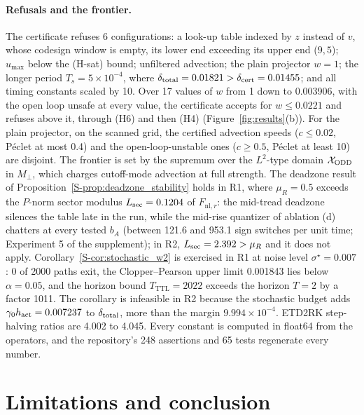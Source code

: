 \paragraph{Refusals and the frontier.}
The certificate refuses 6 configurations: a look-up table indexed by $z$ instead of $v$, whose codesign window is empty, its lower end exceeding its upper end ($9,5$); $u_{\max}$ below the (H-sat) bound; unfiltered advection; the plain projector $w = 1$; the longer period $T_s = 5\times10^{-4}$, where $\delta_{\mathrm{total}} = 0.01821 > \delta_{\mathrm{cert}} = 0.01455$; and all timing constants scaled by 10. Over 17 values of $w$ from 1 down to 0.003906, with the open loop unsafe at every value, the certificate accepts for $w \le 0.0221$ and refuses above it, through (H6) and then (H4) (Figure~\ref{fig:results}(b)). For the plain projector, on the scanned grid, the certified advection speeds ($c \le 0.02$, P\'eclet at most 0.4) and the open-loop-unstable ones ($c \ge 0.5$, P\'eclet at least 10) are disjoint. The frontier is set by the supremum over the $L^2$-type domain $\mathcal{X}_{\mathrm{ODD}}$ in $M_\perp$, which charges cutoff-mode advection at full strength. The deadzone result of Proposition~\ref{S-prop:deadzone_stability} holds in R1, where $\mu_R = 0.5$ exceeds the $P$-norm sector modulus $L_{\mathrm{sec}} = 0.1204$ of $F_{\mathrm{nl},r}$: the mid-tread deadzone silences the table late in the run, while the mid-rise quantizer of ablation (d) chatters at every tested $b_A$ (between 121.6 and 953.1 sign switches per unit time; Experiment 5 of the supplement); in R2, $L_{\mathrm{sec}} = 2.392 > \mu_R$ and it does not apply. Corollary~\ref{S-cor:stochastic_w2} is exercised in R1 at noise level $\sigma^\star = 0.007$: 0 of 2000 paths exit, the Clopper--Pearson upper limit 0.001843 lies below $\alpha = 0.05$, and the horizon bound $T_{\mathrm{TTL}} = 2022$ exceeds the horizon $T = 2$ by a factor 1011. The corollary is infeasible in R2 because the stochastic budget adds $\gamma_0h_{\mathrm{act}} = 0.007237$ to $\delta_{\mathrm{total}}$, more than the margin $9.994\times10^{-4}$. ETD2RK step-halving ratios are 4.002 to 4.045. Every constant is computed in float64 from the operators, and the repository's 248 assertions and 65 tests regenerate every number.

\section{Limitations and conclusion}
\label{sec:limits}


